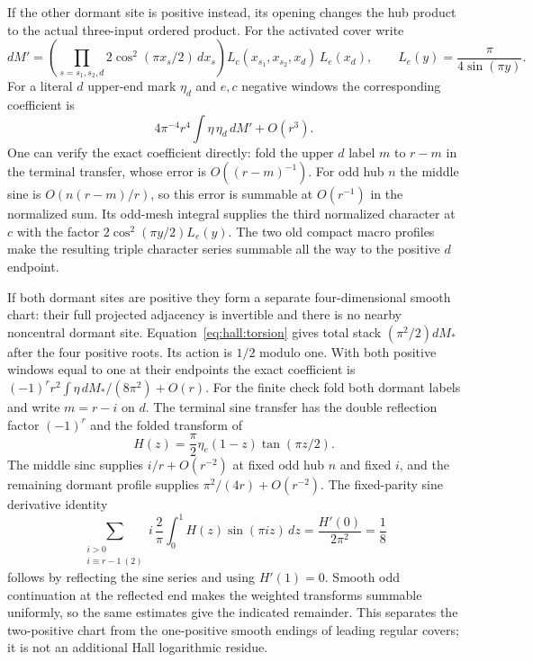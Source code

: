 If the other dormant site is positive instead, its opening changes
the hub product to the actual three-input ordered product. For the
activated cover write
\[
 dM'=\left(\prod_{s=s_1,s_2,d}2\cos^2(\pi x_s/2)\,dx_s\right)
          L_c(x_{s_1},x_{s_2},x_d)\,L_e(x_d),
 \qquad L_e(y)=\frac{\pi}{4\sin(\pi y)} .
\]
For a literal \(d\) upper-end mark \(\eta_d\) and \(e,c\) negative
windows the corresponding coefficient is
\[
                4\pi^{-4}r^4\int\eta\,\eta_d\,dM'+O(r^3).
\]
One can verify the exact coefficient directly: fold the upper \(d\)
label \(m\) to \(r-m\) in the terminal transfer, whose error is
\(O((r-m)^{-1})\). For odd hub \(n\) the middle sine is
\(O(n(r-m)/r)\), so this error is summable at \(O(r^{-1})\) in the
normalized sum. Its odd-mesh integral supplies the third normalized
character at \(c\) with the factor \(2\cos^2(\pi y/2)L_e(y)\).
The two old compact macro profiles make the resulting triple
character series summable all the way to the positive \(d\) endpoint.

If both dormant sites are positive they form a separate
four-dimensional smooth chart: their full projected adjacency
is invertible and there is no nearby noncentral dormant site.
Equation~\eqref{eq:hall:torsion} gives total stack
\((\pi^2/2)dM_*\) after the four positive roots. Its action is
\(1/2\) modulo one. With both positive windows equal to one at
their endpoints the exact coefficient is
\((-1)^r r^2\int\eta\,dM_*/(8\pi^2)+O(r)\).
For the finite check fold both dormant labels and write
\(m=r-i\) on \(d\). The terminal sine transfer has the double
reflection factor \((-1)^r\) and the folded transform of
\[
                 H(z)=\frac{\pi}{2}\eta_e(1-z)\tan(\pi z/2).
\]
The middle sinc supplies \(i/r+O(r^{-2})\) at fixed odd hub \(n\)
and fixed \(i\), and the remaining dormant profile supplies
\(\pi^2/(4r)+O(r^{-2})\). The fixed-parity sine derivative identity
\[
 \sum_{\substack{i>0\\ i\equiv r-1\ (2)}} i\,\frac2\pi
      \int_0^1 H(z)\sin(\pi i z)\,dz
            =\frac{H'(0)}{2\pi^2}=\frac18
\]
follows by reflecting the sine series and using \(H'(1)=0\).
Smooth odd continuation at the reflected end makes the weighted
transforms summable uniformly, so the same estimates give the
indicated remainder. This separates the two-positive chart from
the one-positive smooth endings of leading regular covers; it
is not an additional Hall logarithmic residue.
